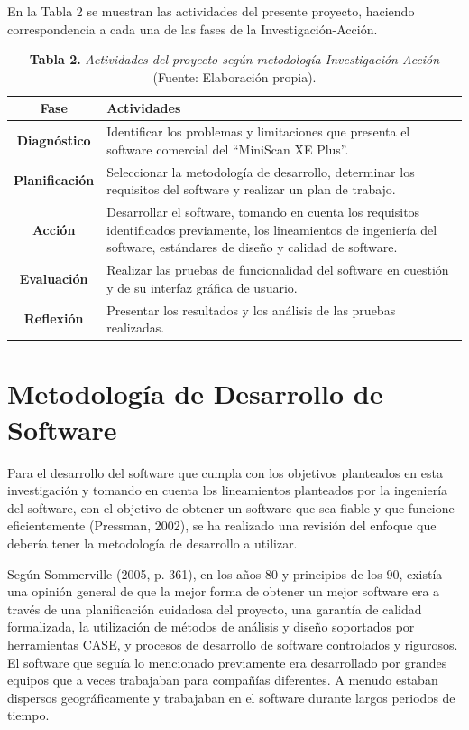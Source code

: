 En la Tabla 2 se muestran las actividades del presente proyecto, haciendo correspondencia a cada una de las fases de la Investigaci\'{o}n-Acci\'{o}n.
	\FloatBarrier %
	\begin{table}[htb]
		\small
		\centering
		\setlength{\extrarowheight}{5pt}
		\begin{tabulary}{15cm}{|c|L|}
			\hline
			\textbf{Fase} & \textbf{Actividades}\\ \hline
			\textbf{Diagn\'{o}stico} & Identificar los problemas y limitaciones que presenta el software comercial del ``MiniScan XE Plus''.\\ \hline
			\textbf{Planificaci\'{o}n} & Seleccionar la metodolog\'{i}a de desarrollo, determinar los requisitos del software y realizar un plan de trabajo.
\\ \hline
			\textbf{Acci\'{o}n} & Desarrollar el software, tomando en cuenta los requisitos identificados previamente, los lineamientos de ingenier\'{i}a del software, est\'{a}ndares de dise\~{n}o y calidad de software.\\ \hline
			\textbf{Evaluaci\'{o}n} & Realizar las pruebas de funcionalidad del software en cuesti\'{o}n y de su interfaz gr\'{a}fica de usuario.\\ \hline
			\textbf{Reflexi\'{o}n} & Presentar los resultados y los an\'{a}lisis de las pruebas realizadas.\\ \hline
	\end{tabulary}
		\caption{\textbf{Tabla 2.} \textit{Actividades del proyecto seg\'{u}n metodolog\'{i}a Investigaci\'{o}n-Acci\'{o}n }		(Fuente: Elaboración propia).}
	\end{table}
	\FloatBarrier %
	
	\section{Metodolog\'{i}a de Desarrollo de Software}
Para el desarrollo del software que cumpla con los objetivos planteados en esta investigaci\'{o}n y tomando en cuenta los lineamientos planteados por la ingenier\'{i}a del software, con el objetivo de obtener un software que sea fiable y que funcione eficientemente (Pressman, 2002), se ha realizado una revisi\'{o}n del enfoque que deber\'{i}a tener la metodolog\'{i}a de desarrollo a utilizar.

Seg\'{u}n Sommerville (2005, p. 361), en los a\~{n}os 80 y principios de los 90, exist\'{i}a una opini\'{o}n general de que la mejor forma de obtener un mejor software era a trav\'{e}s de una planificaci\'{o}n cuidadosa del proyecto, una garant\'{i}a de calidad formalizada, la utilizaci\'{o}n de m\'{e}todos de an\'{a}lisis y dise\~{n}o soportados por herramientas CASE, y procesos de desarrollo de software controlados y rigurosos. El software que segu\'{i}a lo mencionado previamente era desarrollado por grandes equipos que a veces trabajaban para compa\~{n}\'{i}as diferentes. A menudo estaban dispersos geogr\'{a}ficamente y trabajaban en el software durante largos periodos de tiempo.

